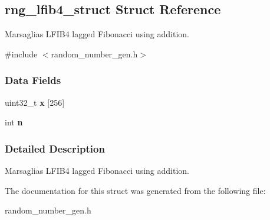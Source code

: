 \hypertarget{structrng__lfib4__struct}{}\subsection{rng\+\_\+lfib4\+\_\+struct Struct Reference}
\label{structrng__lfib4__struct}


Marsaglia\textquotesingle{}s L\+F\+I\+B4 lagged Fibonacci using addition.  




{\ttfamily \#include $<$random\+\_\+number\+\_\+gen.\+h$>$}

\subsubsection*{Data Fields}
\begin{DoxyCompactItemize}
\item 
\mbox{\label{structrng__lfib4__struct_a7fea3d3a8676a248a63b1f2640de79a5}} 
uint32\+\_\+t {\bfseries x} \mbox{[}256\mbox{]}
\item 
\mbox{\label{structrng__lfib4__struct_a00307570b79e5d3597091d2571834e62}} 
int {\bfseries n}
\end{DoxyCompactItemize}


\subsubsection{Detailed Description}
Marsaglia\textquotesingle{}s L\+F\+I\+B4 lagged Fibonacci using addition. 

The documentation for this struct was generated from the following file\+:\begin{DoxyCompactItemize}
\item 
random\+\_\+number\+\_\+gen.\+h\end{DoxyCompactItemize}
